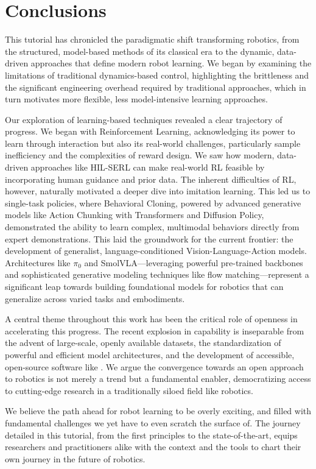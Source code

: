 \section{Conclusions}
\label{sec:conclusions}

This tutorial has chronicled the paradigmatic shift transforming robotics, from the structured, model-based methods of its classical era to the dynamic, data-driven approaches that define modern robot learning. 
We began by examining the limitations of traditional dynamics-based control, highlighting the brittleness and the significant engineering overhead required by traditional approaches, which in turn motivates more flexible, less model-intensive learning approaches.

Our exploration of learning-based techniques revealed a clear trajectory of progress. 
We began with Reinforcement Learning, acknowledging its power to learn through interaction but also its real-world challenges, particularly sample inefficiency and the complexities of reward design. 
We saw how modern, data-driven approaches like HIL-SERL can make real-world RL feasible by incorporating human guidance and prior data. 
The inherent difficulties of RL, however, naturally motivated a deeper dive into imitation learning. This led us to single-task policies, where Behavioral Cloning, powered by advanced generative models like Action Chunking with Transformers and Diffusion Policy, demonstrated the ability to learn complex, multimodal behaviors directly from expert demonstrations. 
This laid the groundwork for the current frontier: the development of generalist, language-conditioned Vision-Language-Action models. 
Architectures like \( \pi_0 \) and SmolVLA---leveraging powerful pre-trained backbones and sophisticated generative modeling techniques like flow matching---represent a significant leap towards building foundational models for robotics that can generalize across varied tasks and embodiments.

A central theme throughout this work has been the critical role of openness in accelerating this progress. 
The recent explosion in capability is inseparable from the advent of large-scale, openly available datasets, the standardization of powerful and efficient model architectures, and the development of accessible, open-source software like \lerobot. 
We argue the convergence towards an open approach to robotics is not merely a trend but a fundamental enabler, democratizing access to cutting-edge research in a traditionally siloed field like robotics.

We believe the path ahead for robot learning to be overly exciting, and filled with fundamental challenges we yet have to even scratch the surface of.
The journey detailed in this tutorial, from the first principles to the state-of-the-art, equips researchers and practitioners alike with the context and the tools to chart their own journey in the future of robotics.